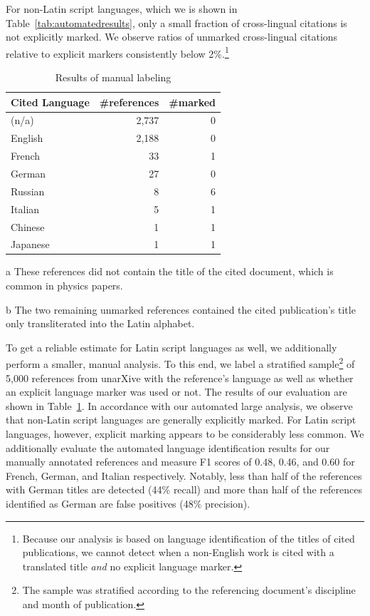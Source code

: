 For non-Latin script languages, which we is shown in Table~\ref{tab:automatedresults}, only a small fraction of cross-lingual citations is not explicitly marked. We observe ratios of unmarked cross-lingual citations relative to explicit markers consistently below 2\%.\footnote{Because our analysis is based on language identification of the titles of cited publications, we cannot detect when a non-English work is cited with a translated title \emph{and} no explicit language marker.}

\begin{table}
\caption{Results of manual labeling}
 \label{tab:manualresults}
  \centering
  \begin{small}
 \begin{threeparttable}
 \begin{tabular}{lrr}
 \toprule
   Cited Language & \#references & \#marked \\
   \midrule
   (n/a)\tnote{a} & 2,737 & 0 \\
   English & 2,188 & 0 \\
   French & 33 & 1 \\
   German & 27 & 0 \\
   Russian & 8 & 6\tnote{b}\\
   Italian & 5 & 1 \\
   Chinese & 1 & 1 \\
   Japanese & 1 & 1 \\
   \bottomrule
 \end{tabular}
 \begin{tablenotes}
    \item[a] These references did not contain the title of the cited document, which is common in physics papers.
    \item[b] The two remaining unmarked references contained the cited publication's title only transliterated into the Latin alphabet.
  \end{tablenotes}
\end{threeparttable}
  \end{small}
\end{table}

To get a reliable estimate for Latin script languages as well, we additionally perform a smaller, manual analysis. To this end, we label a stratified sample\footnote{The sample was stratified according to the referencing document's discipline and month of publication.} of 5,000 references from unarXive with the reference's language as well as whether an explicit language marker was used or not. The results of our evaluation are shown in Table~\ref{tab:manualresults}.
In accordance with our automated large analysis, we observe that non-Latin script languages are generally explicitly marked. For Latin script languages, however, explicit marking appears to be considerably less common. We additionally evaluate the automated language identification results for our manually annotated references and measure F1 scores of 0.48, 0.46, and 0.60 for French, German, and Italian respectively. Notably, less than half of the references with German titles are detected (44\% recall) and more than half of the references identified as German are false positives (48\% precision).

